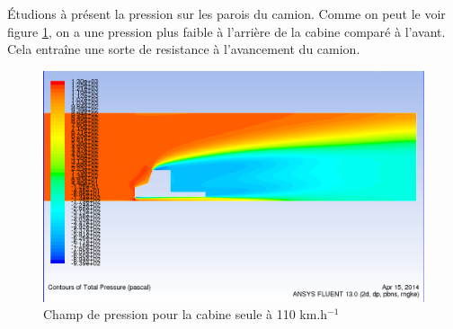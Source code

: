 Étudions à présent la pression sur les parois du camion. Comme on peut le voir figure \ref{figCabPres110}, on a une pression plus faible à l'arrière de la cabine comparé à l'avant. Cela entraîne une sorte de resistance à l'avancement du camion.
\begin{figure}[!h]
\centering
\includegraphics[scale=0.4]{resultsCx/camion110_pressure.png}
\caption{Champ de pression pour la cabine seule à 110 km.h$^{-1}$}
\label{figCabPres110}
\end{figure}

